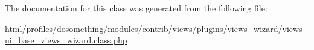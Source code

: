 The documentation for this class was generated from the following file:\begin{DoxyCompactItemize}
\item 
html/profiles/dosomething/modules/contrib/views/plugins/views\_\-wizard/\hyperlink{views__ui__base__views__wizard_8class_8php}{views\_\-ui\_\-base\_\-views\_\-wizard.class.php}\end{DoxyCompactItemize}
